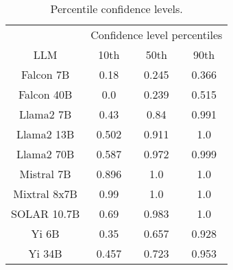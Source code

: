 \begin{table*}
\centering
\begin{tabular}{c|c|c|c}
& \multicolumn{3}{c}{Confidence level percentiles} \\ 
LLM & 10th & 50th & 90th\\ \hline
Falcon 7B & 0.18 & 0.245 & 0.366\\
Falcon 40B & 0.0 & 0.239 & 0.515\\
Llama2 7B & 0.43 & 0.84 & 0.991\\
Llama2 13B & 0.502 & 0.911 & 1.0\\
Llama2 70B & 0.587 & 0.972 & 0.999\\
Mistral 7B & 0.896 & 1.0 & 1.0\\
Mixtral 8x7B & 0.99 & 1.0 & 1.0\\
SOLAR 10.7B & 0.69 & 0.983 & 1.0\\
Yi 6B & 0.35 & 0.657 & 0.928\\
Yi 34B & 0.457 & 0.723 & 0.953\\
\hline
\end{tabular}
\caption{Percentile confidence levels.}
\label{tab:percentile_conf}
\end{table*}
